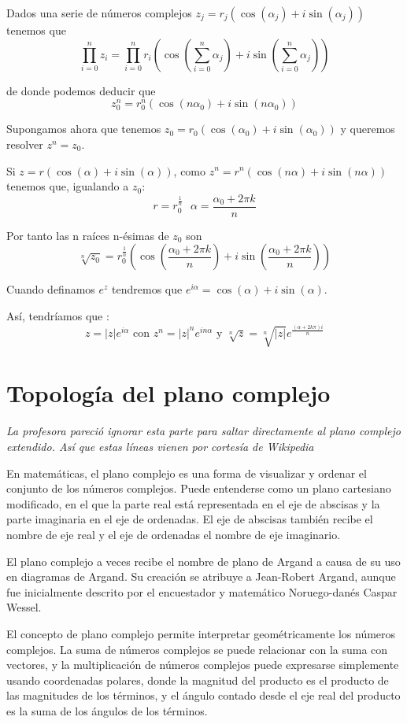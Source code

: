\documentclass{apuntes}
\begin{document}
\begin{example}
Dados una serie de números complejos $z_j=r_j(\cos(α_j)+i\sin(α_j))$ tenemos que
\[\prod_{i=0}^n z_i = \prod_{i=0}^nr_i\left(\cos\left(\sum_{i=0}^n α_j\right)+i\sin\left(\sum_{i=0}^n α_j\right)\right)\]

de donde podemos deducir que
\[z_0^n = r_0^n\left(\cos(nα_0)+i\sin(nα_0)\right)\]
\end{example}

Supongamos ahora que tenemos $z_0=r_0(\cos(α_0)+i\sin(α_0))$ y queremos resolver $z^n=z_0$.

Si $z=r(\cos(α)+i\sin(α))$, como $z^n=r^n(\cos(nα)+i\sin(nα))$ tenemos que, igualando a $z_0$:
\[r=r_0^{\frac{1}{n}} \ \ \ α=\frac{α_0+2πk}{n}\]

Por tanto las n raíces n-ésimas de $z_0$ son
\[\sqrt[n]{z_0}=r_0^{\frac{1}{n}}\left(\cos\left(\frac{α_0+2πk}{n}\right)+i\sin\left(\frac{α_0+2πk}{n}\right)\right)\]

Cuando definamos $e^z$ tendremos que $e^{iα}=\cos(α)+i\sin(α)$.

Así, tendríamos que :
\[z=|z|e^{iα} \text{ con } z^n=|z|^ne^{inα} \text{ y } \sqrt[n]{z}=\sqrt[n]{|z|}e^{\frac{(α+2kπ)i}{n}}\]
\section{Topología del plano complejo}
\textit{La profesora pareció ignorar esta parte para saltar directamente al plano complejo extendido. Así que estas líneas vienen por cortesía de Wikipedia}

En matemáticas, el plano complejo es una forma de visualizar y ordenar el conjunto de los números complejos. Puede entenderse como un plano cartesiano modificado, en el que la parte real está representada en el eje de abscisas y la parte imaginaria en el eje de ordenadas. El eje de abscisas también recibe el nombre de eje real y el eje de ordenadas el nombre de eje imaginario.

El plano complejo a veces recibe el nombre de plano de Argand a causa de su uso en diagramas de Argand. Su creación se atribuye a Jean-Robert Argand, aunque fue inicialmente descrito por el encuestador y matemático Noruego-danés Caspar Wessel.

El concepto de plano complejo permite interpretar geométricamente los números complejos. La suma de números complejos se puede relacionar con la suma con vectores, y la multiplicación de números complejos puede expresarse simplemente usando coordenadas polares, donde la magnitud del producto es el producto de las magnitudes de los términos, y el ángulo contado desde el eje real del producto es la suma de los ángulos de los términos.
\end{document}

